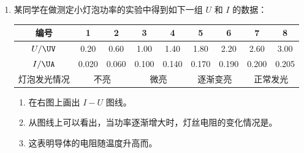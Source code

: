 \documentclass[\gkver]{gaokaozhenti}
\begin{document}
\begin{enumerate}
\item
某同学在做测定小灯泡功率的实验中得到如下一组 $U$ 和 $I$ 的数据：

\begin{center}
\begin{tabular}{|c|c|c|c|c|c|c|c|c|}
\hline
编号 & 1 & 2 & 3 & 4 & 5 & 6 & 7 & 8 \\ \hline
$U/\UV$ & 0.20 & 0.60 & 1.00 & 1.40 & 1.80 & 2.20 & 2.60 & 3.00 \\ \hline
$I/\UA$ & 0.020 & 0.060 & 0.100 & 0.140 & 0.170 & 0.190 & 0.200 & 0.205 \\ \hline
灯泡发光情况 & \multicolumn{2}{c|}{不亮} & \multicolumn{2}{c|}{微亮} & \multicolumn{2}{c|}{逐渐变亮} & \multicolumn{2}{c|}{正常发光} \\ \hline
\end{tabular}
\end{center}

\begin{enumerate}
	\item
	在右图上画出 $I-U$ 图线。
	\item
	从图线上可以看出，当功率逐渐增大时，灯丝电阻的变化情况是。
	\item
	这表明导体的电阻随温度升高而。
\end{enumerate}
\onepicture[w=8cm, align=right]{}


\end{enumerate}
\end{document}
